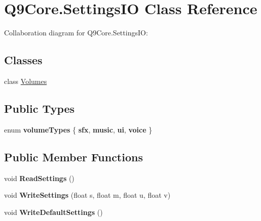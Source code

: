 \hypertarget{class_q9_core_1_1_settings_i_o}{}\section{Q9\+Core.\+Settings\+IO Class Reference}
\label{class_q9_core_1_1_settings_i_o}


Collaboration diagram for Q9\+Core.\+Settings\+IO\+:
\subsection*{Classes}
\begin{DoxyCompactItemize}
\item 
class \mbox{\hyperlink{class_q9_core_1_1_settings_i_o_1_1_volumes}{Volumes}}
\end{DoxyCompactItemize}
\subsection*{Public Types}
\begin{DoxyCompactItemize}
\item 
\mbox{\label{class_q9_core_1_1_settings_i_o_af2ca89b497dcfd2fc94f3b746073af1a}} 
enum {\bfseries volume\+Types} \{ {\bfseries sfx}, 
{\bfseries music}, 
{\bfseries ui}, 
{\bfseries voice}
 \}
\end{DoxyCompactItemize}
\subsection*{Public Member Functions}
\begin{DoxyCompactItemize}
\item 
\mbox{\label{class_q9_core_1_1_settings_i_o_a58c6e334236fd498a04531d8dce33d1f}} 
void {\bfseries Read\+Settings} ()
\item 
\mbox{\label{class_q9_core_1_1_settings_i_o_a8c6f111fd3454d2e35be53cd9fd0d8c3}} 
void {\bfseries Write\+Settings} (float s, float m, float u, float v)
\item 
\mbox{\label{class_q9_core_1_1_settings_i_o_aec5ed95da8fc47c3e4773e08fadd22fc}} 
void {\bfseries Write\+Default\+Settings} ()
\end{DoxyCompactItemize}
